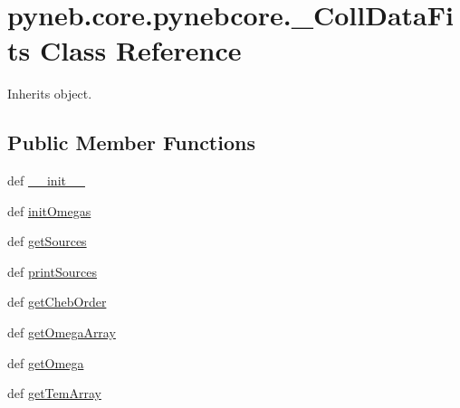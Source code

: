 \hypertarget{classpyneb_1_1core_1_1pynebcore_1_1___coll_data_fits}{\section{pyneb.\-core.\-pynebcore.\-\_\-\-Coll\-Data\-Fits Class Reference}
\label{classpyneb_1_1core_1_1pynebcore_1_1___coll_data_fits}
}


Inherits object.

\subsection*{Public Member Functions}
\begin{DoxyCompactItemize}
\item 
def \hyperlink{classpyneb_1_1core_1_1pynebcore_1_1___coll_data_fits_a34dd1c347e0328a9f282d418e14cf653}{\-\_\-\-\_\-init\-\_\-\-\_\-}
\item 
def \hyperlink{classpyneb_1_1core_1_1pynebcore_1_1___coll_data_fits_ab8bb7b193ca2b9ccf6adf11453347226}{init\-Omegas}
\item 
def \hyperlink{classpyneb_1_1core_1_1pynebcore_1_1___coll_data_fits_aa5874082b04a926561f86ee86bc65531}{get\-Sources}
\item 
def \hyperlink{classpyneb_1_1core_1_1pynebcore_1_1___coll_data_fits_a3bee57ecbbe7d4156299b385e7b0c624}{print\-Sources}
\item 
def \hyperlink{classpyneb_1_1core_1_1pynebcore_1_1___coll_data_fits_ac2e555f92570ed4df42926d0c415ac4c}{get\-Cheb\-Order}
\item 
def \hyperlink{classpyneb_1_1core_1_1pynebcore_1_1___coll_data_fits_acca4425c4b7d2e08d0b1b9fe6e1846a7}{get\-Omega\-Array}
\item 
def \hyperlink{classpyneb_1_1core_1_1pynebcore_1_1___coll_data_fits_a07beca7cf9ee37f231754f0458fb8c2f}{get\-Omega}
\item 
def \hyperlink{classpyneb_1_1core_1_1pynebcore_1_1___coll_data_fits_a6b53fa73abb34d16f1066dc52604f25c}{get\-Tem\-Array}
\end{DoxyCompactItemize}

